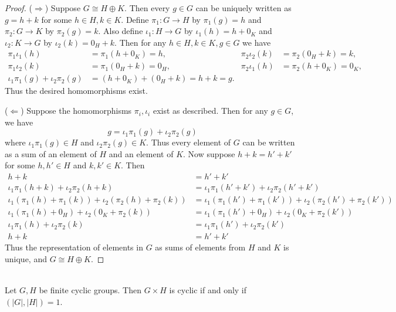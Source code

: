 \documentclass{article}
\begin{document}
\begin{proof}
    ($\Rightarrow$) Suppose $G \cong H \oplus K$. Then every $g \in G$ can be uniquely written as $g = h + k$ for some $h \in H, k \in K$. Define $\pi_1: G \to H$ by $\pi_1(g) = h$ and $\pi_2: G \to K$ by $\pi_2(g) = k$. Also define $\iota_1: H \to G$ by $\iota_1(h) = h + 0_K$ and $\iota_2: K \to G$ by $\iota_2(k) = 0_H + k$. Then for any $h \in H, k \in K, g \in G$ we have
    \begin{align*}
        \pi_1\iota_1(h) &= \pi_1(h + 0_K) = h, & \pi_2\iota_2(k) &= \pi_2(0_H + k) = k, \\
        \pi_1\iota_2(k) &= \pi_1(0_H + k) = 0_H, & \pi_2\iota_1(h) &= \pi_2(h + 0_K) = 0_K, \\
        \iota_1\pi_1(g) + \iota_2\pi_2(g) &= (h + 0_K) + (0_H + k) = h + k = g.
    \end{align*}
    Thus the desired homomorphisms exist.

    ($\Leftarrow$) Suppose the homomorphisms $\pi_i, \iota_i$ exist as described. Then for any $g \in G$, we have
    \[
        g = \iota_1\pi_1(g) + \iota_2\pi_2(g)
    \]
    where $\iota_1\pi_1(g) \in H$ and $\iota_2\pi_2(g) \in K$. Thus every element of $G$ can be written as a sum of an element of $H$ and an element of $K$. Now suppose $h + k = h' + k'$ for some $h, h' \in H$ and $k, k' \in K$. Then
    \begin{align*}
        h + k &= h' + k' \\
        \iota_1\pi_1(h + k) + \iota_2\pi_2(h + k) &= \iota_1\pi_1(h' + k') + \iota_2\pi_2(h' + k') \\
        \iota_1(\pi_1(h) + \pi_1(k)) + \iota_2(\pi_2(h) + \pi_2(k)) &= \iota_1(\pi_1(h') + \pi_1(k')) + \iota_2(\pi_2(h') + \pi_2(k')) \\
        \iota_1(\pi_1(h) + 0_H) + \iota_2(0_K + \pi_2(k)) &= \iota_1(\pi_1(h') + 0_H) + \iota_2(0_K + \pi_2(k')) \\
        \iota_1\pi_1(h) + \iota_2\pi_2(k) &= \iota_1\pi_1(h') + \iota_2\pi_2(k') \\
        h + k &= h' + k'
    \end{align*}
    Thus the representation of elements in $G$ as sums of elements from $H$ and $K$ is unique, and $G \cong H \oplus K$.

\end{proof}




\begin{problem}[1.8.5] \\ 
    Let $G, H$ be finite cyclic groups. Then $G \times H$ is cyclic if and only if $(|G|,|H|) = 1$.
\end{problem}
\end{document}
